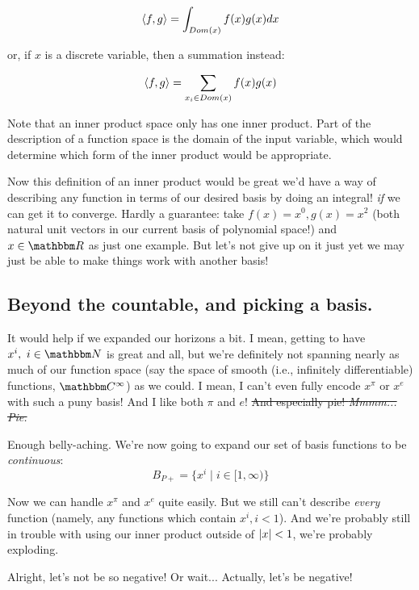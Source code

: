 \documentclass[letterpaper,12pt]{report}
\begin{document}
\[\innerprod[f][g] = \int_{Dom(x)} f(x)g(x) dx \]

or, if \(x\) is a discrete variable, then a summation instead:

\[\innerprod[f][g] = \sum_{x_i \in Dom(x)} f(x)g(x) \]

Note that an inner product space only has one inner product.
Part of the description of a function space is the domain 
of the input variable, which would determine which form
of the inner product would be appropriate.\par

Now this definition of an inner product would be great 
\textemdash{}
we'd have a way of describing any function in terms of 
our desired basis by doing an integral!
\textemdash{}
\emph{if}
we can get it to converge.
Hardly a guarantee: take \(f(x) = x^0, g(x) = x^2\)
(both natural unit vectors in 
our current basis of polynomial space!)
and \(x \in \domain{R}\) as just one example.
But let's not give up on it just yet \textemdash{}
we may just be able to make things work with another basis!

\subsection{Beyond the countable, and picking a basis.}

It would help if
we expanded our horizons a bit.
I mean, getting to have \(x^i,\ i \in \domain{N}\)
is great and all, but we're definitely not spanning nearly
as much of our function space (say the space of smooth
(i.e., infinitely differentiable) functions, 
\(\domain{C}^\infty\)) as we could.
I mean, I can't even fully encode \(x^\pi\) or \(x^e\) 
with such a puny basis! And I like both \(\pi\) and \(e\)!
\sout{And especially pie! \textit{Mmmm... Pie.}}\par

Enough belly-aching. We're now going to expand our
set of basis functions to be \emph{continuous}:
\[B_{P+} = \{x^i \mid i \in [1, \infty)\} \] 

Now we can handle \(x^\pi\) and \(x^e\) quite easily.
But we still can't describe \emph{every} function (namely,
any functions which contain \(x^i, i < 1\)).
And we're probably still in trouble with using our
inner product \textemdash{} outside of \(\left|x\right| < 1\),
we're probably exploding.\par

Alright, let's not be so negative! Or wait... 
Actually, let's be negative!
\end{document}
